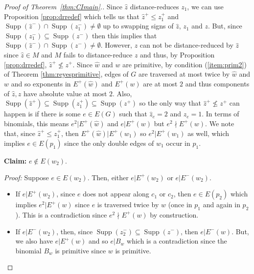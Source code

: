 \documentclass[a4paper, 12pt]{article}
\theoremstyle{plain}
\theoremstyle{definition}
\theoremstyle{remark}
\begin{document}
\begin{proof}[Proof of Theorem~\ref{thm:CImain}.]
Since $\hat z$ distance-reduces $z_1$, we can use Proposition \ref{prop:drredef} which tells us that $\hat z^+ \le z_1^+$ and $\operatorname{Supp}(\hat z^-) \cap \operatorname{Supp}(z_1^-) \neq \emptyset$ up to swapping signs of $\hat z$, $z_1$ and $z$. But, since $\operatorname{Supp}(z_1^-) \subseteq \operatorname{Supp}(z^-)$ then this implies that $\operatorname{Supp}(\hat z^-) \cap \operatorname{Supp}(z^-) \neq \emptyset$. However, $z$ can not be distance-reduced by $\hat z$ since $\hat z \in M$ and $M$ fails to distance-reduce $z$ and thus, by Proposition \ref{prop:drredef}, $\hat z^+ \not\le z^+$. Since $\hat w$ and $w$ are primitive, by condition (\ref{item:prim2}) of Theorem \ref{thm:reyesprimitive}, edges of $G$ are traversed at most twice by $\hat w$ and $w$ and so exponents in $E^+(\hat w)$ and $E^+(w)$ are at most $2$ and thus components of $\hat z,z$ have absolute value at most $2$. Also, $\operatorname{Supp}(\hat z^+) \subseteq \operatorname{Supp}(z_1^+) \subseteq\operatorname{Supp}(z^+)$ so the only way that $\hat z^+ \not\le z^+$ can happen is if there is some $e \in E(G)$ such that $\hat z_e=2$ and $z_e=1$. In terms of binomials, this means $e^2 | E^+( \hat w)$ and $e|E^+(w)$ but $e^2 \nmid E^+(w)$. We note that, since $\hat z^+ \le z_1^+$, then $E^+(\hat w)|E^+(w_1)$ so $e^2|E^+(w_1)$ as well, which implies $e \in E(p_1)$ since the only double edges of $w_1$ occur in $p_1$.


\vspace{2mm}
\textbf{Claim:} $e \not \in E(w_2)$.

\textit{Proof:} Suppose $e \in E(w_2)$. Then, either $e|E^+(w_2)$ or $e|E^-(w_2)$.
\begin{itemize}
    \item If $e|E^+(w_2)$, since $e$ does not appear along $c_1$ or $c_2$, then $e \in E(p_2)$ which implies $e^2 |E^+(w)$ since $e$ is traversed twice by $w$ (once in $p_1$ and again in $p_2$). This is a contradiction since $e^2 \nmid E^+(w)$ by construction.
    \item If $e|E^-(w_2)$, then, since $\operatorname{Supp}(z_2^-) \subseteq \operatorname{Supp}(z^-)$, then $e|E^-(w)$. But, we also have $e|E^+(w)$ and so $e|B_w$ which is a contradiction since the binomial $B_w$ is primitive since $w$ is primitive.
\end{itemize}


\end{proof}
\end{document}
